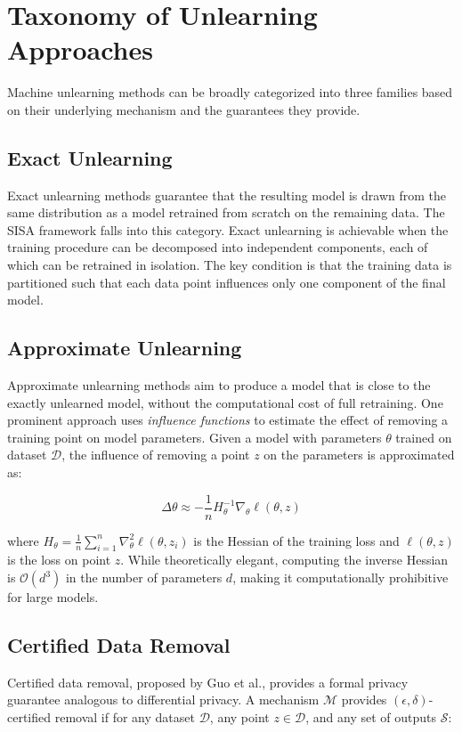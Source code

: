 \section{Taxonomy of Unlearning Approaches}

Machine unlearning methods can be broadly categorized into three families based on their underlying mechanism and the guarantees they provide.

\subsection{Exact Unlearning}
Exact unlearning methods guarantee that the resulting model is drawn from the same distribution as a model retrained from scratch on the remaining data. The SISA framework falls into this category. Exact unlearning is achievable when the training procedure can be decomposed into independent components, each of which can be retrained in isolation. The key condition is that the training data is partitioned such that each data point influences only one component of the final model.

\subsection{Approximate Unlearning}
Approximate unlearning methods aim to produce a model that is close to the exactly unlearned model, without the computational cost of full retraining. One prominent approach uses \textit{influence functions} to estimate the effect of removing a training point on model parameters. Given a model with parameters $\theta$ trained on dataset $\mathcal{D}$, the influence of removing a point $z$ on the parameters is approximated as:

\[
\Delta\theta \approx -\frac{1}{n} H_{\theta}^{-1} \nabla_\theta \ell(\theta, z)
\]

where $H_{\theta} = \frac{1}{n} \sum_{i=1}^{n} \nabla_\theta^2 \ell(\theta, z_i)$ is the Hessian of the training loss and $\ell(\theta, z)$ is the loss on point $z$. While theoretically elegant, computing the inverse Hessian is $\mathcal{O}(d^3)$ in the number of parameters $d$, making it computationally prohibitive for large models.

\subsection{Certified Data Removal}
Certified data removal, proposed by Guo et al., provides a formal privacy guarantee analogous to differential privacy. A mechanism $\mathcal{M}$ provides $(\epsilon, \delta)$-certified removal if for any dataset $\mathcal{D}$, any point $z \in \mathcal{D}$, and any set of outputs $\mathcal{S}$:

